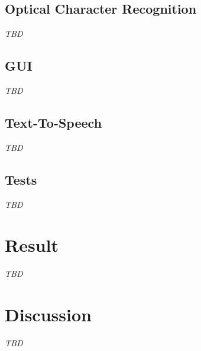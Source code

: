 \documentclass[a4paper, english]{scrartcl}
\begin{document}
\subsection{Optical Character Recognition}
\textit{TBD}

\subsection{GUI}
\textit{TBD}

\subsection{Text-To-Speech}
\textit{TBD}

\subsection{Tests}
\textit{TBD}

\section{Result}
\textit{TBD}

\section{Discussion}
\textit{TBD}

\pagebreak


\end{document}
